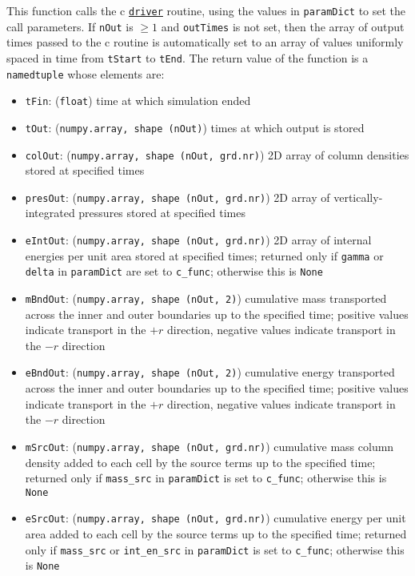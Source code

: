 \documentclass[12pt]{article}
\begin{document}
This function calls the c \hyperref[sssec:driver]{\texttt{driver}} routine, using the values in \verb=paramDict= to set the call parameters. If \verb=nOut= is $\geq 1$ and \texttt{outTimes} is not set, then the array of output times passed to the c routine is automatically set to an array of values uniformly spaced in time from \verb=tStart= to \verb=tEnd=. The return value of the function is a \texttt{namedtuple} whose elements are:
\begin{itemize}
\item \texttt{tFin}: (\texttt{float}) time at which simulation ended
\item \texttt{tOut}: (\texttt{numpy.array, shape (nOut)}) times at which output is stored
\item \texttt{colOut}: (\texttt{numpy.array, shape (nOut, grd.nr)}) 2D array of column densities stored at specified times
\item \texttt{presOut}: (\texttt{numpy.array, shape (nOut, grd.nr)}) 2D array of vertically-integrated pressures stored at specified times
\item \texttt{eIntOut}: (\texttt{numpy.array, shape (nOut, grd.nr)}) 2D array of internal energies per unit area stored at specified times; returned only if \verb=gamma= or \verb=delta= in \texttt{paramDict} are set to \verb=c_func=; otherwise this is \texttt{None}
\item \texttt{mBndOut}: (\texttt{numpy.array, shape (nOut, 2)}) cumulative mass transported across the inner and outer boundaries up to the specified time; positive values indicate transport in the $+r$ direction, negative values indicate transport in the $-r$ direction
\item \texttt{eBndOut}: (\texttt{numpy.array, shape (nOut, 2)}) cumulative energy transported across the inner and outer boundaries up to the specified time; positive values indicate transport in the $+r$ direction, negative values indicate transport in the $-r$ direction
\item \texttt{mSrcOut}: (\texttt{numpy.array, shape (nOut, grd.nr)}) cumulative mass column density added to each cell by the source terms up to the specified time; returned only if \verb=mass_src= in \texttt{paramDict} is set to \verb=c_func=; otherwise this is \texttt{None}
\item \texttt{eSrcOut}: (\texttt{numpy.array, shape (nOut, grd.nr)}) cumulative energy per unit area added to each cell by the source terms up to the specified time; returned only if \verb=mass_src= or \verb=int_en_src= in \texttt{paramDict} is set to \verb=c_func=; otherwise this is \texttt{None}

\end{itemize}
\end{document}
